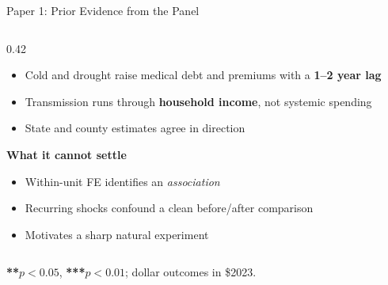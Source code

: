 \documentclass[aspectratio=169,11pt]{beamer}
\newcommand{\emphcolor}[1]{{\color{WarmOrange}\textbf{#1}}}
\newcommand{\tealtext}[1]{{\color{Teal}#1}}
\newcommand{\graytext}[1]{{\color{WarmGray}#1}}
\begin{document}
\begin{frame}{Paper 1: Prior Evidence from the Panel}
\begin{columns}[T]
\begin{column}{0.42\textwidth}
      \begin{itemize}\itemsep0.12em
        \item Cold and drought raise medical debt and premiums with a \emphcolor{1--2 year lag}
        \item Transmission runs through \emphcolor{household income}, not systemic spending
        \item State and county estimates agree in direction
      \end{itemize}
      \vspace{0.3em}
      \textbf{\tealtext{What it cannot settle}}
      \begin{itemize}\itemsep0.12em
        \item Within-unit FE identifies an \emph{association}
        \item Recurring shocks confound a clean before/after comparison
        \item Motivates a sharp natural experiment
      \end{itemize}
    \end{column}
  \end{columns}
  \vspace{0.1em}
  \begin{center}\graytext{\scriptsize \emphcolor{**}\(p{<}0.05\), \emphcolor{***}\(p{<}0.01\); dollar outcomes in \$2023.}\end{center}
\end{frame}
\end{document}
